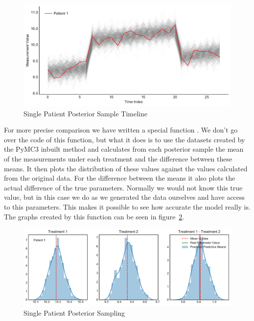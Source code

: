 \documentclass[12pt,a4paper,leqno]{report}
\theoremstyle{plain}
\theoremstyle{definition}
\theoremstyle{remark}
\begin{document}
\bigskip
\begin{figure}[H]
    \caption{Single Patient Posterior Sample Timeline}\label{singlepatientposteriortimeline}
    \bigskip
    \includegraphics[width=\textwidth,height=\textheight,keepaspectratio]{posterior_sample_timeline_single_patient.pdf}
\end{figure}
\bigskip

For more precise comparison we have written a special function
. We don't go over the code of this function,
but what it does is to use the datasets created by the PyMC3 inbuilt method and
calculates from each posterior sample the mean of the measurements under each treatment and the difference between
these means. It then plots the distribution of these values
against the values calculated from the
original data. For the difference between the means it also plots the actual
difference of the true parameters. Normally we would not know
this true value, but in this case we do as we generated the data ourselves and have
access to this parameters. This
makes it possible to see how accurate the model really is. The graphs created by this
function can be seen in figure\ \ref{singlepatientposteriorsampling}.

\bigskip
\begin{figure}[H]
    \caption{Single Patient Posterior Sampling}\label{singlepatientposteriorsampling}
    \bigskip
    \includegraphics[width=\textwidth,height=\textheight,keepaspectratio]{single_patient_posterior_sampling.pdf}
\end{figure}
\bigskip
\end{document}
